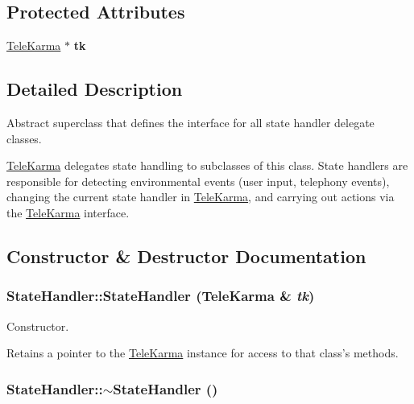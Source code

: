 \subsection*{Protected Attributes}
\begin{CompactItemize}
\item 
\hypertarget{classStateHandler_be2e0705379f3861112ca89c64de648e}{
\hyperlink{classTeleKarma}{TeleKarma} $\ast$ \textbf{tk}}
\label{classStateHandler_be2e0705379f3861112ca89c64de648e}

\end{CompactItemize}


\subsection{Detailed Description}
Abstract superclass that defines the interface for all state handler delegate classes. 

\hyperlink{classTeleKarma}{TeleKarma} delegates state handling to subclasses of this class. State handlers are responsible for detecting environmental events (user input, telephony events), changing the current state handler in \hyperlink{classTeleKarma}{TeleKarma}, and carrying out actions via the \hyperlink{classTeleKarma}{TeleKarma} interface.  

\subsection{Constructor \& Destructor Documentation}
\hypertarget{classStateHandler_4195b90b30a542cc31b1cfe4ac9df201}{
\subsubsection[{StateHandler}]{\setlength{\rightskip}{0pt plus 5cm}StateHandler::StateHandler ({\bf TeleKarma} \& {\em tk})}}
\label{classStateHandler_4195b90b30a542cc31b1cfe4ac9df201}


Constructor. 

Retains a pointer to the \hyperlink{classTeleKarma}{TeleKarma} instance for access to that class's methods. \hypertarget{classStateHandler_e80b39428525c88bdeea3efd94d540f9}{
\subsubsection[{$\sim$StateHandler}]{\setlength{\rightskip}{0pt plus 5cm}StateHandler::$\sim$StateHandler ()}}
\label{classStateHandler_e80b39428525c88bdeea3efd94d540f9}


